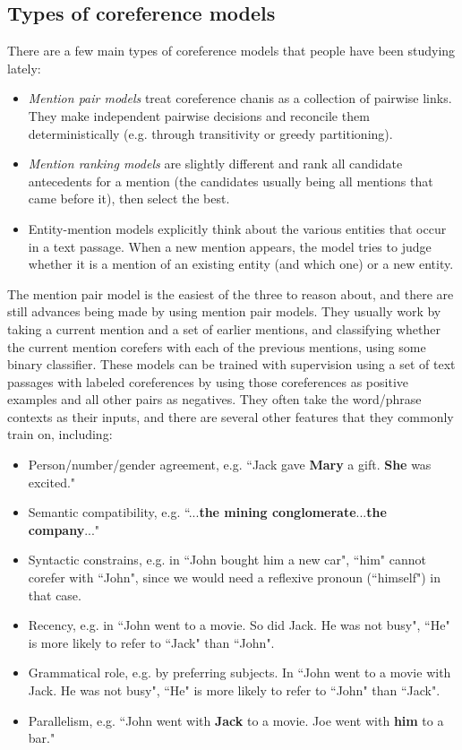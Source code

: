 \subsection{Types of coreference models}
There are a few main types of coreference models that people have been studying lately:
\begin{itemize}
\item \emph{Mention pair models} treat coreference chanis as a collection of pairwise links. They make independent pairwise decisions and reconcile them deterministically (e.g. through transitivity or greedy partitioning).
\item \emph{Mention ranking models} are slightly different and rank all candidate antecedents for a mention (the candidates usually being all mentions that came before it), then select the best.
\item Entity-mention models explicitly think about the various entities that occur in a text passage. When a new mention appears, the model tries to judge whether it is a mention of an existing entity (and which one) or a new entity.
\end{itemize}
The mention pair model is the easiest of the three to reason about, and there are still advances being made by using mention pair models. They usually work by taking a current mention and a set of earlier mentions, and classifying whether the current mention corefers with each of the previous mentions, using some binary classifier. These models can be trained with supervision using a set of text passages with labeled coreferences by using those coreferences as positive examples and all other pairs as negatives. They often take the word/phrase contexts as their inputs, and there are several other features that they commonly train on, including:
\begin{itemize}
\item Person/number/gender agreement, e.g. ``Jack gave \textbf{Mary} a gift. \textbf{She} was excited."
\item Semantic compatibility, e.g. ``...\textbf{the mining conglomerate}...\textbf{the company}..."
\item Syntactic constrains, e.g. in ``John bought him a new car", ``him" cannot corefer with ``John", since we would need a reflexive pronoun (``himself") in that case.
\item Recency, e.g. in ``John went to a movie. So did Jack. He was not busy", ``He" is more likely to refer to ``Jack" than ``John".
\item Grammatical role, e.g. by preferring subjects. In ``John went to a movie with Jack. He was not busy", ``He" is more likely to refer to ``John" than ``Jack".
\item Parallelism, e.g. ``John went with \textbf{Jack} to a movie. Joe went with \textbf{him} to a bar."
\end{itemize}

